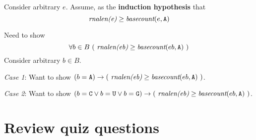 \documentclass[12pt, oneside]{article}
\begin{document}
Consider arbitrary $e$. Assume, as the {\bf induction hypothesis} that 
\[
\textit{rnalen(e)} \geq \textit{basecount}(e, \texttt{A})
\]

Need to show 
\[
 \forall b \in B ~(~\textit{rnalen(eb)} \geq \textit{basecount}(eb, \texttt{A})~) 
\]
Consider arbitrary $b \in B$. 


{\it Case 1}: Want to show $(b = \texttt{A}) \to (~\textit{rnalen(eb)} \geq \textit{basecount}(eb, \texttt{A})~) $.

\vfill

{\it Case 2}: Want to show $(b = \texttt{C} \lor b = \texttt{U} \lor b = \texttt{G}) \to (~\textit{rnalen(eb)} \geq \textit{basecount}(eb, \texttt{A})~) $.

\vfill
\vfill


\newpage

\section*{Review quiz questions}
\end{document}
